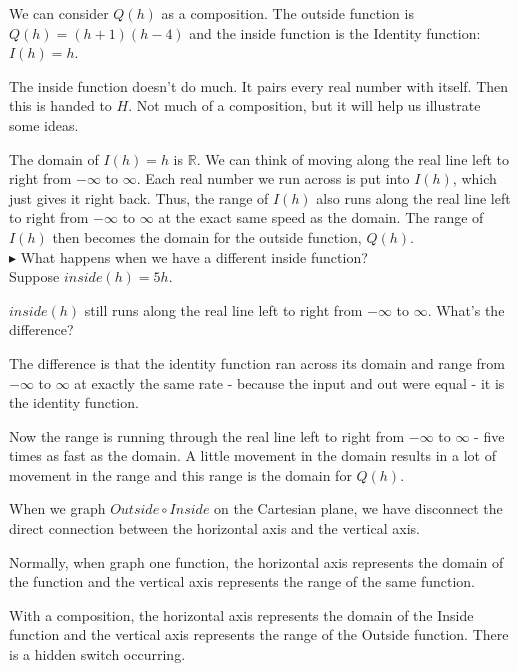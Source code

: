 \documentclass{ximera}
\begin{document}
We can consider $Q(h)$ as a composition.  The outside function is $Q(h) = (h+1)(h-4)$ and the inside function is the Identity function: $I(h)=h$.  

The inside function doesn't do much.  It pairs every real number with itself.  Then this is handed to $H$. Not much of a composition, but it will help us illustrate some ideas.



The domain of $I(h)=h$ is \textbf{$\mathbb{R}$}.  We can think of moving along the real line left to right from $-\infty$ to $\infty$.  Each real number we run across is put into $I(h)$, which just gives it right back.  Thus, the range of $I(h)$ also runs along the real line left to right from $-\infty$ to $\infty$ at the exact same speed as the domain.  The range of $I(h)$ then becomes the domain for the outside function, $Q(h)$. \\



$\blacktriangleright$  What happens when we have a different inside function? \\


Suppose $inside(h) = 5h$.


$inside(h)$ still runs along the real line left to right from $-\infty$ to $\infty$. What's the difference?

The difference is that the identity function ran across its domain and range from $-\infty$ to $\infty$ at exactly the same rate - because the input and out were equal - it is the identity function.


Now the range is running through the real line left to right from $-\infty$ to $\infty$ - five times as fast as the domain. A little movement in the domain results in a lot of movement in the range and this range is the domain for $Q(h)$.






\begin{paradox}

When we graph $Outside \circ Inside$ on the Cartesian plane, we have disconnect the direct connection between the horizontal axis and the vertical axis.

Normally, when graph one function, the horizontal axis represents the domain of the function and the vertical axis represents the range of the same function.

With a composition, the horizontal axis represents the domain of the Inside function and the vertical axis represents the range of the Outside function.  There is a hidden switch occurring.

\end{paradox}
\end{document}
